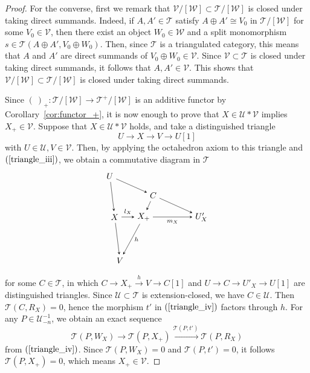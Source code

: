 \documentclass[a4paper,reqno,10pt]{amsart}
\theoremstyle{definition}
\theoremstyle{definition}
\theoremstyle{definition}
\theoremstyle{definition}
\theoremstyle{plain}
\newcommand{\CT}{\mathcal{T}}
\newcommand{\CU}{\mathcal{U}}
\newcommand{\CV}{\mathcal{V}}
\newcommand{\CW}{\mathcal{W}}
\begin{document}
\begin{proof}
For the converse, 
\color{blue}
first we remark that $\CV/[\CW]\subset\CT/[\CW]$ is closed under taking direct summands. Indeed, if $A,A'\in\CT$ satisfy $A\oplus A'\cong V_0$ in $\CT/[\CW]$ for some $V_0\in\CV$, then there exist an object $W_0\in\CW$ and a split monomorphism $s\in\CT(A\oplus A',V_0\oplus W_0)$. Then, since $\CT$ is a triangulated category, this means that $A$ and $A'$ are direct summands of $V_0\oplus W_0\in\CV$.
Since $\CV\subset\CT$ is closed under taking direct summands,
it follows that $A,A'\in\CV$.
This shows that $\CV/[\CW]\subset\CT/[\CW]$ is closed under taking direct summands. 

Since $(\ )_+\colon\CT/[\CW]\to \CT^+/[\CW]$ is an additive functor by Corollary~\ref{cor:functor_+}, it is now enough to prove that 
\normalcolor
$X\in\CU\ast\CV$ implies $X_+\in\CV$.
Suppose that $X\in\CU\ast\CV$ holds, and take a distinguished triangle
\[
U\to X\to V\to U[1]
\]
with $U\in\CU,V\in\CV$. Then, by applying the octahedron axiom to this triangle and $(\ref{triangle_iii})$, we obtain a commutative diagram in $\CT$
\[
\begin{tikzpicture}[>=stealth]
\node (1) at (-1.4,1.7) {$U$};
\node (2) at (-1.2,0) {$X$};
\node (3) at (-0.98,-1.8) {$V$};

\node (4) at (0.4,0.9) {$C$};
\node (5) at (0,0) {$X_+$};
\node (6) at (2.4,0) {$U'_X$};
\draw[->] (1) -- (2);
\draw[->] (1) -- (4);
\draw[->] (2) -- (3);
\draw[->] (2) -- node[above,font=\scriptsize] {$l_X$} (5);
\draw[->] (4) -- (5);
\draw[->] (4) -- (6);
\draw[->] (5) -- node[right,font=\scriptsize] {$h$} (3);
\draw[->] (5) -- node[below,font=\scriptsize] {$m_X$} (6);
\end{tikzpicture}
\]
for some $C\in\CT$, in which $C\to X_+\xrightarrow{h}V\to C[1]$ and $U\to C\to U'_X\to U[1]$ are distinguished triangles. Since $\CU\subset\CT$ is extension-closed, we have $C\in\CU$. Then $\CT(C,R_X)=0$, hence the morphism $t'$ in $(\ref{triangle_iv})$ factors through $h$. For any $P\in\CU_{-n}^{-1}$, we obtain an exact sequence
\[
\CT(P,W_X)\to\CT(P,X_+)\xrightarrow{\CT(P,t')}\CT(P,R_X)
\]
from $(\ref{triangle_iv})$. Since $\CT(P,W_X)=0$ and $\CT(P,t')=0$, it follows $\CT(P,X_+)=0$, which means $X_+\in\CV$.
\end{proof}
\end{document}
